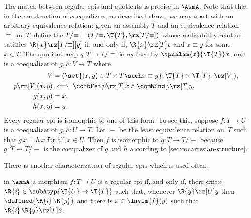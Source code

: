 The match between regular epis and quotients is precise in $\AsmA$.
Note that that in the construction of coequalizers, as described
above, we may start with an arbitrary equivalence relation: given an
assembly $T$ and an equivalence relation $\equiv$ on~$T$, define
the  $T/{\equiv} = (T/{\equiv}, \T{T},
\rz[T/{\equiv}])$ whose realizability relation satisfies $\R{x}
\rz[T/{\equiv}] [y]$ if, and only if, $\R{x} \rz[T] x$ and $x \equiv
y$ for some $x \in T$. The quotient map $q : T \to T/{\equiv}$ is
realized by $\tpcalam{x}{\T{T}} x$, and is a coequalizer of $g,
h : V \to T$ where
%
\begin{align*}
  V &= (\set{(x,y) \in T \times T \such x \equiv y},
             \T{T} \times \T{T}, {\rz[V]}),\\
  p \rz[V] (x,y) &\iff
  \combFst\,p \rz[T] x \land \combSnd\,p \rz[T] y, \\
  g (x, y) &= x,\\
  h (x, y) &= y.
\end{align*}
%
Every regular epi is isomorphic to one of this form. To see this,
suppose $f : T \to U$ is a coequalizer of $g, h : U
\to T$. Let $\equiv$ be the least equivalence relation on~$T$
such that $g\,x = h\,x$ for all $x \in U$. Then $f$ is isomorphic to
$q : T \to T/{\equiv}$ because $g : T \to
T/{\equiv}$ is the coequalizer of $g$ and $h$ according to
\cref{sec:cocartesian-structure}.

There is another characterization of regular epis which is used often.

\begin{proposition}
  \label{prop:reg-epi-when}%
  in $\AsmA$ a morphism $f : T \to U$ is a regular epi
  if, and only if, there exists $\R{i} \in \subAtyp{\T{U} \to \T{T}}$
  such that, whenever $\R{y} \rz[U] y$ then $\defined{\R{i}\,\R{y}}$
  and there is $x \in \invim{f}(y)$ such that $\R{i}\,\R{y} \rz[T] x$.
\end{proposition}

